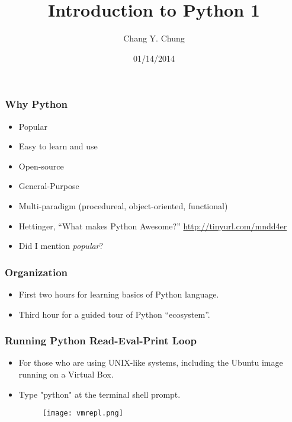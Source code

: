 \documentclass{beamer}
\begin{document}
\title{Introduction to Python 1}
\date{01/14/2014}
\author{Chang Y. Chung}

{
\begin{frame}[noframenumbering]
\titlepage
\end{frame}}

\begin{frame}[fragile]
\frametitle{Why Python}
\begin{itemize}
\item Popular
\item Easy to learn and use
\item Open-source
\item General-Purpose
\item Multi-paradigm (procedureal, object-oriented, functional) 
\item Hettinger, ``What makes Python Awesome?''\cite{Hettinger2013}
      \url{http://tinyurl.com/mndd4er}
\item Did I mention \emph{popular}?
\end{itemize}
\end{frame}

\begin{frame}[fragile]
\frametitle{Organization}
\begin{itemize}
\item First two hours for learning basics of Python language.
\item Third hour for a guided tour of Python ``ecosystem''.
\end{itemize}
\end{frame}

\begin{frame}[fragile]
\frametitle{Running Python Read-Eval-Print Loop}
\begin{itemize}
\item For those who are using UNIX-like systems,
      including the Ubuntu image running on a Virtual Box.
\item Type "python" at the terminal shell prompt.
\begin{figure}[h]
\texttt{[image: vmrepl.png]}
\end{figure}
\end{itemize}
\end{frame}
\end{document}
